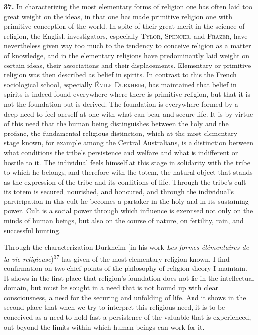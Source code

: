 \documentclass[12pt,a4paper]{book}
\newcommand{\opage}[1]{\marginnote{\footnotesize\textit{[#1]}}}
\begin{document}
\medskip

\noindent\textbf{37.} In characterizing the most elementary forms of religion one has
often laid too great weight on the ideas, in that one has made primitive religion one
with primitive conception of the world. In spite of their great merit in the science
of religion, the English investigators, especially \textsc{Tylor}, \textsc{Spencer},
and \textsc{Frazer}, have nevertheless given way too much to the tendency to conceive
religion as a matter of knowledge, and in the elementary religions have predominantly
laid weight on certain ideas, their associations and their displacements. Elementary
or primitive religion was then described as belief in spirits. In contrast to this
the French 
\opage{87}sociological school, especially \textsc{Émile Durkheim}, has maintained
that belief in spirits is indeed found everywhere where there is primitive religion,
but that it is not the foundation but is derived. The foundation is everywhere formed
by a deep need to feel oneself at one with what can bear and secure life. It is by
virtue of this need that the human being distinguishes between the holy and the
profane, the fundamental religious distinction, which at the most elementary stage
known, for example among the Central Australians, is a distinction between what
conditions the tribe's persistence and welfare and what is indifferent or hostile to
it. The individual feels himself at this stage in solidarity with the tribe to which
he belongs, and therefore with the totem, the natural object that stands as the
expression of the tribe and its conditions of life. Through the tribe's cult its totem
is secured, nourished, and honoured, and through the individual's participation in
this cult he becomes a partaker in the holy and in its sustaining power. Cult is a
social power through which influence is exercised not only on the minds of human
beings, but also on the course of nature, on fertility, rain, and successful hunting.

Through the characterization Durkheim (in his work \emph{Les formes élémentaires de la
vie religieuse})\textsuperscript{37} has given of the most elementary religion known, I
find confirmation on two chief points of the philosophy-of-religion theory I maintain.
It shows in the first place that religion's foundation does not lie in the intellectual
domain, but must be sought in a need that is not bound up with clear consciousness, a
need for the securing and unfolding of life. And it shows in the second place that
when we try to interpret this religious need, it is to be conceived as a need to hold
fast a persistence of the valuable that is experienced, out beyond the limits within
which human beings can work for it.
\end{document}
